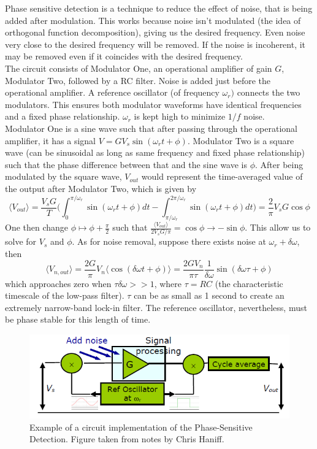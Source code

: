 \documentclass[a4paper]{article}
\begin{document}
\begin{Note}
Phase sensitive detection is a technique to reduce the effect of noise, that is being added after modulation. This works because noise isn't modulated (the idea of orthogonal function decomposition), giving us the desired frequency. Even noise very close to the desired frequency will be removed. If the noise is incoherent, it may be removed even if it coincides with the desired frequency.\\[5pt]
The circuit consists of Modulator One, an operational amplifier of gain $G$, Modulator Two, followed by a RC filter. Noise is added just before the operational amplifier. A reference oscillator (of frequency $\omega_r)$ connects the two modulators. This ensures both modulator waveforms have identical frequencies and a fixed phase relationship. $\omega_r$ is kept high to minimize $1/f$ noise.\\[5pt]
Modulator One is a sine wave such that after passing through the operational amplifier, it has a signal $V=GV_s\sin(\omega_rt+\phi)$. Modulator Two is a square wave (can be sinusoidal as long as same frequency and fixed phase relationship) such that the phase difference between that and the sine wave is $\phi$. After being modulated by the square wave, $V_{out}$ would represent the time-averaged value of the output after Modulator Two, which is given by 
$$\langle V_{out}\rangle=\frac{V_sG}{T}\bigg(\int_0^{\pi/\omega_r}\sin(\omega_rt+\phi)dt-\int_{\pi/\omega_r}^{2\pi/\omega_r}\sin(\omega_rt+\phi)dt\bigg)=\frac{2}{\pi}V_sG\cos\phi$$
One then change $\phi\mapsto\phi+\frac{\pi}{2}$ such that $\frac{\langle V_{out}\rangle}{2V_sG/\pi}=\cos\phi\rightarrow-\sin\phi$. This allow us to solve for $V_s$ and $\phi$. As for noise removal, suppose there exists noise at $\omega_r+\delta\omega$, then
$$\langle V_{n,out}\rangle=\frac{2G}{\pi}V_n\langle\cos(\delta\omega t+\phi)\rangle=\frac{2GV_n}{\pi\tau}\frac{1}{\delta\omega}\sin(\delta\omega\tau+\phi)$$
which approaches zero when $\tau\delta\omega>>1$, where $\tau=RC$ (the characteristic timescale of the low-pass filter). $\tau$ can be as small as 1 second to create an extremely narrow-band lock-in filter. The reference oscillator, nevertheless, must be phase stable for this length of time.
\end{Note}
\begin{figure}[H]
    \centering
    \includegraphics[scale=0.9]{phase_sensitive.PNG}
    \caption{Example of a circuit implementation of the Phase-Sensitive Detection. Figure taken from notes by Chris Haniff.}
    \label{phase_sensitive}
\end{figure}
\end{document}
